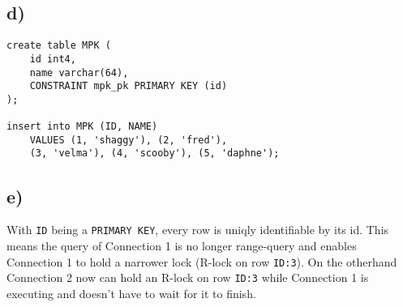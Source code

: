 \documentclass[a4paper,english,abstract=on]{scrartcl}
\begin{document}
\subsection*{d)}
\begin{lstlisting}
create table MPK (
	id int4,
	name varchar(64),
	CONSTRAINT mpk_pk PRIMARY KEY (id)
);

insert into MPK (ID, NAME) 
	VALUES (1, 'shaggy'), (2, 'fred'), 
	(3, 'velma'), (4, 'scooby'), (5, 'daphne');
\end{lstlisting}

\subsection*{e)}
With \texttt{ID} being a \texttt{PRIMARY KEY}, every row is uniqly identifiable by its id. This means the query of Connection 1 is no longer range-query and enables Connection 1 to hold a narrower lock (R-lock on row \texttt{ID:3}). On the otherhand Connection 2 now can hold an R-lock on row \texttt{ID:3} while Connection 1 is executing and doesn't have to wait for it to finish.
\end{document}
